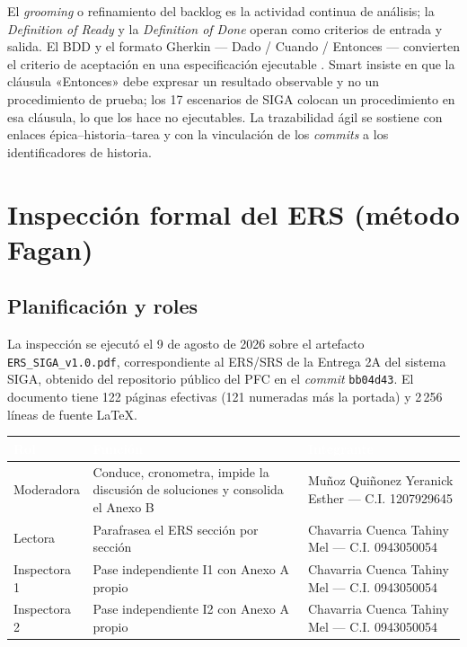 \documentclass[11pt,letterpaper]{article}
\newcommand{\thead}[1]{\cellcolor{uteqverde}\textcolor{white}{\textbf{#1}}}
\begin{document}
El \emph{grooming} o refinamiento del backlog es la actividad continua de análisis; la \emph{Definition of Ready} y la \emph{Definition of Done} operan como criterios de entrada y salida. El BDD y el formato Gherkin --- Dado / Cuando / Entonces --- convierten el criterio de aceptación en una especificación ejecutable \cite{smart2014}. Smart insiste en que la cláusula «Entonces» debe expresar un resultado observable y no un procedimiento de prueba; los 17 escenarios de SIGA colocan un procedimiento en esa cláusula, lo que los hace no ejecutables. La trazabilidad ágil se sostiene con enlaces épica--historia--tarea y con la vinculación de los \emph{commits} a los identificadores de historia.

\section{Inspección formal del ERS (método Fagan)}

\subsection{Planificación y roles}
La inspección se ejecutó el 9 de agosto de 2026 sobre el artefacto \texttt{ERS\_SIGA\_v1.0.pdf}, correspondiente al ERS/SRS de la Entrega 2A del sistema SIGA, obtenido del repositorio público del PFC en el \emph{commit} \texttt{bb04d43}. El documento tiene 122 páginas efectivas (121 numeradas más la portada) y 2\,256 líneas de fuente \LaTeX.

\begin{center}
\small
\begin{tabular}{|p{2.4cm}|p{5.4cm}|p{6.6cm}|}
\hline
\thead{Rol} & \thead{Función} & \thead{Integrante} \\ \hline
Moderadora & Conduce, cronometra, impide la discusión de soluciones y consolida el Anexo B & Muñoz Quiñonez Yeranick Esther --- C.I. 1207929645 \\ \hline
Lectora & Parafrasea el ERS sección por sección & Chavarria Cuenca Tahiny Mel --- C.I. 0943050054 \\ \hline
Inspectora 1 & Pase independiente I1 con Anexo A propio & Chavarria Cuenca Tahiny Mel --- C.I. 0943050054 \\ \hline
Inspectora 2 & Pase independiente I2 con Anexo A propio & Chavarria Cuenca Tahiny Mel --- C.I. 0943050054 \\ \hline
\end{tabular}
\end{center}
\end{document}
